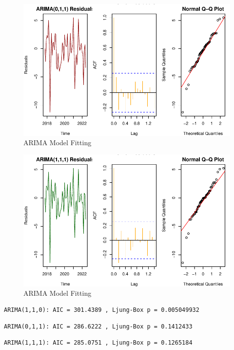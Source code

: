 \documentclass[
  11pt,
]{article}
\begin{document}
\begin{figure}[H]

{\centering \includegraphics{project_files/figure-pdf/fig-ARIMA Model Fitting-2.pdf}

}

\caption{ARIMA Model Fitting}

\end{figure}%

\begin{figure}[H]

{\centering \includegraphics{project_files/figure-pdf/fig-ARIMA Model Fitting-3.pdf}

}

\caption{ARIMA Model Fitting}

\end{figure}%

\begin{verbatim}
ARIMA(1,1,0): AIC = 301.4389 , Ljung-Box p = 0.005049932 
\end{verbatim}

\begin{verbatim}
ARIMA(0,1,1): AIC = 286.6222 , Ljung-Box p = 0.1412433 
\end{verbatim}

\begin{verbatim}
ARIMA(1,1,1): AIC = 285.0751 , Ljung-Box p = 0.1265184 
\end{verbatim}
\end{document}
